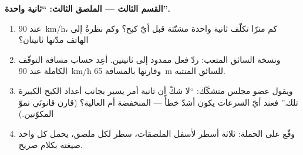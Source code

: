\begin{problem}
\medskip\noindent\textbf{القسم الثالث --- الملصق الثالث:
``ثانية واحدة''.}
\begin{enumerate}[resume]
  \item عند \qty{90}{km/h}، كم مترًا تكلّف ثانية واحدة
        مشتّتة قبل أيّ كبح؟ وكم نظرةٌ إلى الهاتف مدّتها
        ثانيتان؟
  \item ونسخة السائق المتعب: ردّ فعل ممدود إلى ثانيتين. أعِد
        حساب مسافة التوقّف الكاملة عند \qty{90}{km/h}
        وقارنها بالمسافة \qty{65}{m} للسائق المنتبه.
  \item ويقول عضو مجلس متشكّك: ``لا شكّ أن ثانية أمر يسير
        بجانب أعداد الكبح الكبيرة تلك.'' فعند أيّ السرعات
        يكون أشدّ خطأً --- المنخفضة أم العالية؟ (قارن
        قانونَي نموّ المكوّنين.)
  \item وقّع على الحملة: ثلاثة أسطر لأسفل الملصقات، سطر لكل
        ملصق، يحمل كل واحد صيغته بكلام صريح.
\end{enumerate}
\end{problem}
